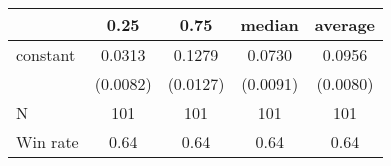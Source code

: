 \begin{tabular}{lcccc}
\hline
         &   0.25   &   0.75   &  median  & average   \\
\midrule
\midrule
constant & 0.0313   & 0.1279   & 0.0730   & 0.0956    \\
         & (0.0082) & (0.0127) & (0.0091) & (0.0080)  \\
N        & 101      & 101      & 101      & 101       \\
Win rate & 0.64     & 0.64     & 0.64     & 0.64      \\
\hline
\end{tabular}